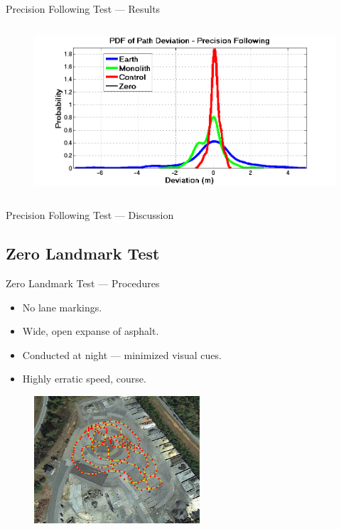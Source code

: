 \documentclass{beamer}
\begin{document}
\begin{frame}{Precision Following Test --- Results}
\begin{columns}
\begin{column}{0.5\textwidth}
\begin{figure}
          \end{figure}
          \vspace{-20pt}
          \begin{figure}
            \includegraphics[width=\textwidth]{../graphics/precision_following_dev_pdf.png}
          \end{figure}
        \end{column}
      \end{columns}
    \end{frame}

    \begin{frame}{Precision Following Test --- Discussion}
    \end{frame}


  \subsection{Zero Landmark Test}
    \begin{frame}{Zero Landmark Test --- Procedures}
      \begin{itemize}
        \item No lane markings.
        \item Wide, open expanse of asphalt.
        \item Conducted at night --- minimized visual cues.
        \item Highly erratic speed, course.
      \end{itemize}
      \begin{figure}
        \centering
        \includegraphics[width=0.55\textwidth]{../graphics/zero_landmark_path.png}
      \end{figure}     
    \end{frame}
\end{document}
